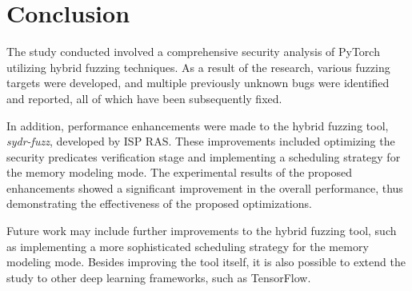 \section{Conclusion}

The study conducted involved a comprehensive security analysis of PyTorch utilizing hybrid fuzzing techniques. As a result of the research, various fuzzing targets were developed, and multiple previously unknown bugs were identified and reported, all of which have been subsequently fixed.

In addition, performance enhancements were made to the hybrid fuzzing tool, \textit{sydr-fuzz}, developed by ISP RAS. These improvements included optimizing the security predicates verification stage and implementing a scheduling strategy for the memory modeling mode. The experimental results of the proposed enhancements showed a significant improvement in the overall performance, thus demonstrating the effectiveness of the proposed optimizations.

Future work may include further improvements to the hybrid fuzzing tool, such as implementing a more sophisticated scheduling strategy for the memory modeling mode. Besides improving the tool itself, it is also possible to extend the study to other deep learning frameworks, such as TensorFlow.